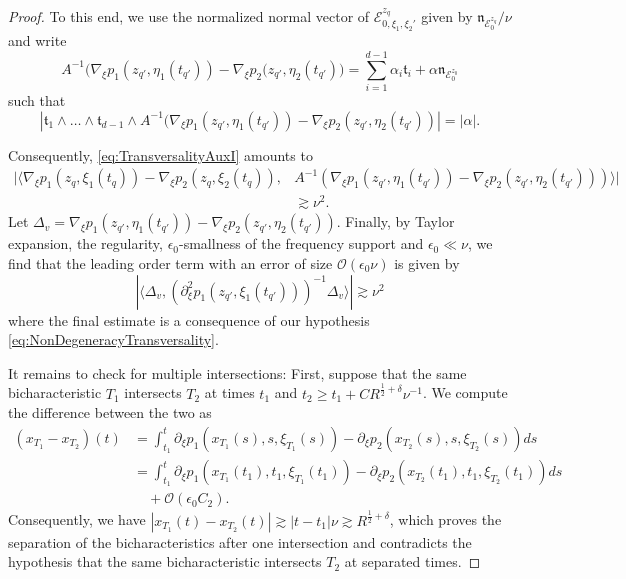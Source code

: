 \documentclass{amsart}
\theoremstyle{definition}
\begin{document}
\begin{proof}
To this end, we use the normalized normal vector of $\mathcal{E}^{z_q}_{0,\xi_1,\xi_2'}$ given by $\mathfrak{n}_{\mathcal{E}_0^{z_q}} / \nu$ and write
\begin{equation*}
A^{-1} \big( \nabla_{\xi} p_1(z_{q'},\eta_1(t_{q'})) - \nabla_{\xi} p_2(z_{q'},\eta_2(t_{q'}) \big) = \sum_{i=1}^{d-1} \alpha_i \mathfrak{t}_i + \alpha \mathfrak{n}_{\mathcal{E}^{z_0}_{0}}
\end{equation*}
such that
\begin{equation*}
| \mathfrak{t}_1 \wedge \ldots \wedge \mathfrak{t}_{d-1} \wedge A^{-1} \big( \nabla_{\xi} p_1(z_{q'},\eta_1(t_{q'})) - \nabla_{\xi} p_2(z_{q'},\eta_2(t_{q'})) | = |\alpha|.
\end{equation*}

Consequently, \eqref{eq:TransversalityAuxI} amounts to
\begin{equation*}
\begin{split}
 | \langle \nabla_{\xi} p_1(z_q,\xi_1(t_q)) - \nabla_{\xi} p_2(z_q,\xi_2(t_q)), &A^{-1} (\nabla_{\xi} p_1(z_{q'},\eta_1(t_{q'})) - \nabla_{\xi} p_2(z_{q'},\eta_2(t_{q'}))) \rangle | \\&\gtrsim \nu^2.
 \end{split}
\end{equation*}
Let $\Delta_v = \nabla_{\xi} p_1(z_{q'},\eta_1(t_{q'})) - \nabla_{\xi} p_2(z_{q'},\eta_2(t_{q'}))$.
Finally, by Taylor expansion, the regularity, $\epsilon_0$-smallness of the frequency support and $\epsilon_0 \ll \nu$, we find that the leading order term with an error of size $\mathcal{O}(\epsilon_0 \nu)$ is given by
\begin{equation}
\label{eq:LeadingOrderTermTransversality}
|\langle \Delta_v , (\partial_{\xi}^2 p_1(z_{q'},\xi_1(t_{q'})))^{-1} \Delta_v \rangle | \gtrsim \nu^2
\end{equation}
where the final estimate is a consequence of our  hypothesis \eqref{eq:NonDegeneracyTransversality}.

\medskip

It remains to check for multiple intersections: First, suppose that the same bicharacteristic $T_1$ intersects $T_2$ at times $t_1$ and $t_2 \geq t_1 + C R^{\frac{1}{2}+\delta} \nu^{-1}$. We compute the difference between the two as
\begin{equation*}
\begin{split}
(x_{T_1} - x_{T_2})(t) &= \int_{t_1}^t \partial_{\xi} p_1(x_{T_1}(s),s,\xi_{T_1}(s)) - \partial_{\xi} p_2(x_{T_2}(s),s,\xi_{T_2}(s)) ds \\
&= \int_{t_1}^t \partial_{\xi} p_1(x_{T_1}(t_1),t_1,\xi_{T_1}(t_1)) - \partial_{\xi} p_2(x_{T_2}(t_1),t_1,\xi_{T_2}(t_1)) ds \\
&\quad + \mathcal{O}(\epsilon_0 C_2).
\end{split}
\end{equation*}
Consequently, we have $|x_{T_1}(t) - x_{T_2}(t)| \gtrsim |t-t_1| \nu \gtrsim R^{\frac{1}{2}+\delta}$, which proves the separation of the bicharacteristics after one intersection and contradicts the hypothesis that the same bicharacteristic intersects $T_2$ at separated times.


\end{proof}
\end{document}

